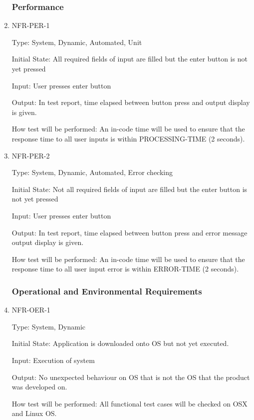 \documentclass[12pt, titlepage]{article}
\begin{document}
\begin{enumerate}
\subsubsection{Performance}

\item{NFR-PER-1\\}

Type: System, Dynamic, Automated, Unit

Initial State: All required fields of input are filled but the enter button is not yet pressed

Input: User presses enter button

Output: In test report, time elapsed between button press and output display is given.

How test will be performed: An in-code time will be used to ensure that the response time to all user inputs is within PROCESSING-TIME (2 seconds).

\item{NFR-PER-2\\}

Type: System, Dynamic, Automated, Error checking

Initial State: Not all required fields of input are filled but the enter button is not yet pressed

Input: User presses enter button

Output: In test report, time elapsed between button press and error message output display is given.

How test will be performed: An in-code time will be used to ensure that the response time to all user input error is within ERROR-TIME (2 seconds).

\subsubsection{Operational and Environmental Requirements}

\item{NFR-OER-1\\}

Type: System, Dynamic

Initial State: Application is downloaded onto OS but not yet executed.

Input: Execution of system

Output: No unexpected behaviour on OS that is not the OS that the product was developed on.

How test will be performed: All functional test cases will be checked on OSX and Linux OS.


\end{enumerate}
\end{document}
